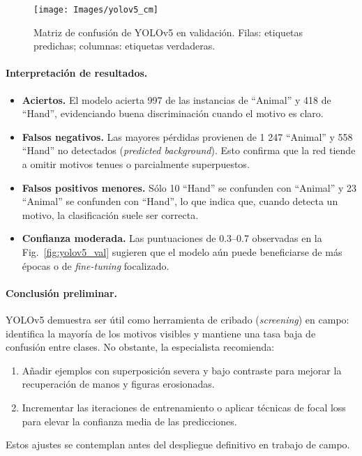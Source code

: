 \begin{figure}[htpb]
  \centering
  \texttt{[image: Images/yolov5\_cm]}
  \caption{Matriz de confusión de YOLOv5 en validación.
           Filas: etiquetas predichas; columnas: etiquetas verdaderas.}
  \label{fig:yolov5_cm}
\end{figure}

\paragraph{Interpretación de resultados.}

\begin{itemize}
  \item \textbf{Aciertos.}
        El modelo acierta 997 de las instancias de “Animal” y 418 de “Hand”, evidenciando buena discriminación cuando el motivo es claro.
  \item \textbf{Falsos negativos.}
        Las mayores pérdidas provienen de 1 247 “Animal” y 558 “Hand” no detectados (\emph{predicted background}).
        Esto confirma que la red tiende a omitir motivos tenues o parcialmente superpuestos.
  \item \textbf{Falsos positivos menores.}
        Sólo 10 “Hand” se confunden con “Animal” y 23 “Animal” se confunden con “Hand”, lo que indica que, cuando detecta un motivo, la clasificación suele ser correcta.
  \item \textbf{Confianza moderada.}
        Las puntuaciones de 0.3–0.7 observadas en la Fig.~\ref{fig:yolov5_val} sugieren que el modelo aún puede beneficiarse de más épocas o de \emph{fine-tuning} focalizado.
\end{itemize}

\paragraph{Conclusión preliminar.}
YOLOv5 demuestra ser útil como herramienta de cribado (\emph{screening}) en campo: identifica la mayoría de los motivos visibles y mantiene una tasa baja de confusión entre clases.
No obstante, la especialista recomienda:

\begin{enumerate}
  \item Añadir ejemplos con superposición severa y bajo contraste para mejorar la recuperación de manos y figuras erosionadas.
  \item Incrementar las iteraciones de entrenamiento o aplicar técnicas de focal loss para elevar la confianza media de las predicciones.
\end{enumerate}
Estos ajustes se contemplan antes del despliegue definitivo en trabajo de campo.


